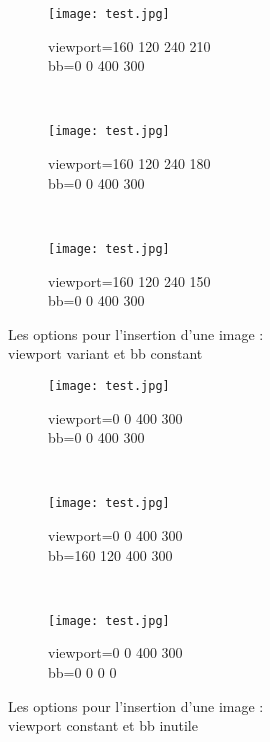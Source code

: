\begin{figure}[h]
    \begin{subfigure}[b]{0.3\textwidth}
        \texttt{[image: test.jpg]}
        \caption{viewport=160 120 240 210\\bb=0 0 400 300}%
        \label{essai_g}
    \end{subfigure}
    ~
    \begin{subfigure}[b]{0.3\textwidth}
        \texttt{[image: test.jpg]}
        \caption{viewport=160 120 240 180\\bb=0 0 400 300}%
        \label{essai_h}
    \end{subfigure}
    ~
    \begin{subfigure}[b]{0.3\textwidth}
        \texttt{[image: test.jpg]}
        \caption{viewport=160 120 240 150\\bb=0 0 400 300}%
        \label{essai_i}
    \end{subfigure}
    \caption{Les options pour l'insertion d'une image :\\viewport variant et bb constant}%
    \label{viewport variant et bb constant}

\end{figure}


\begin{figure}[h]
    \centering
    \begin{subfigure}[b]{0.3\textwidth}
        \texttt{[image: test.jpg]}
        \caption{viewport=0 0 400 300\\bb=0 0 400 300}
        \label{essai_a}
    \end{subfigure}
    ~
    \begin{subfigure}[b]{0.3\textwidth}
        \texttt{[image: test.jpg]}
        \caption{viewport=0 0 400 300\\bb=160 120 400 300}
        \label{essai_2}
    \end{subfigure}
    ~
    \begin{subfigure}[b]{0.3\textwidth}
        \texttt{[image: test.jpg]}
        \caption{viewport=0 0 400 300\\bb=0 0 0 0}
        \label{essai_3}
    \end{subfigure}
    \caption{Les options pour l'insertion d'une image :\\viewport constant et bb inutile}%
    \label{viewport constant et bb inutile}

\end{figure}

